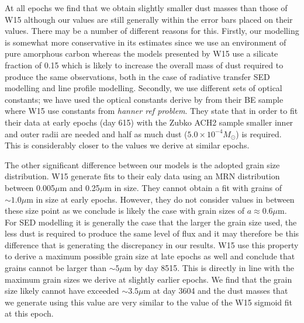\documentclass[useAMS,usenatbib,usegraphicx]{mnras}
\begin{document}
At all epochs we find that we obtain slightly smaller dust masses than those of W15 although our values are still generally within the error bars placed on their values.  There may be a number of different reasons for this.  Firstly, our modelling is somewhat more conservative in its estimates since we use an environment of pure amorphous carbon whereas the models presented by W15 use a silicate fraction of 0.15 which is likely to increase the overall mass of dust required to produce the same observations, both in the case of radiative transfer SED modelling and line profile modelling.  Secondly, we use different sets of optical constants; we have used the optical constants derive by \cite{Zubko1996} from their BE sample where W15 use constants from \cite{Hanner1988}\textit{hanner ref problem}.  They state that in order to fit their data at early epochs (day 615) with the Zubko ACH2 sample smaller inner and outer radii are needed and half as much dust ($5.0 \times 10^{-4}M_{\odot}$) is required.  This is considerably closer to the values we derive at similar epochs.

The other significant difference between our models is the adopted grain size distribution.  W15 generate fits to their ealy data using an MRN distribution between 0.005$\mu$m and 0.25$\mu$m in size.  They cannot obtain a fit with grains of $\sim 1.0 \mu$m in size at early epochs.  However, they do not consider values in between these size point as we conclude is likely the case with grain sizes of $a \approx 0.6\mu$m.  For SED modelling it is generally the case that the larger the grain size used, the less dust is required to produce the same level of flux and it may therefore be this difference that is generating the discrepancy in our results.  W15 use this property to derive a maximum possible grain size at late epochs as well and conclude that grains cannot be larger than $\sim 5\mu$m by day 8515.  This is directly in line with the maximum grain sizes we derive at slightly earlier epochs.  We find that the grain size likely cannot have exceeded $\sim 3.5\mu$m at day 3604 and the dust masses that we generate using this value are very similar to the value of the W15 sigmoid fit at this epoch.
\end{document}
